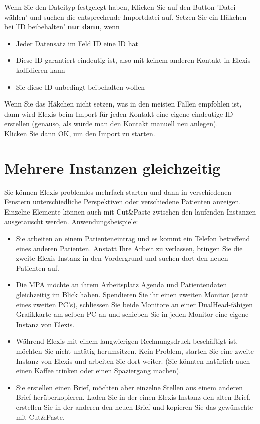 Wenn Sie den Dateityp festgelegt haben, Klicken Sie auf den Button 'Datei wählen' und suchen die entsprechende Importdatei auf. Setzen Sie ein Häkchen bei 'ID beibehalten' \textbf{nur dann}, wenn \begin{itemize}
\item Jeder Datensatz im Feld ID eine ID hat
\item Diese ID garantiert eindeutig ist, also mit keinem anderen Kontakt in Elexis kollidieren kann
\item Sie diese ID unbedingt beibehalten wollen
\end{itemize}
Wenn Sie das Häkchen nicht setzen, was in den meisten Fällen empfohlen ist, dann wird Elexis beim Import für jeden Kontakt eine eigene eindeutige ID erstellen (genauso, als würde man den Kontakt manuell neu anlegen).\\
Klicken Sie dann OK, um den Import zu starten.

 \section{Mehrere Instanzen gleichzeitig}
 Sie können Elexis problemlos mehrfach starten und dann in verschiedenen
 Fenstern unterschiedliche Perspektiven oder verschiedene Patienten anzeigen.
 Einzelne Elemente können auch mit Cut\&Paste zwischen den laufenden Instanzen
 ausgetauscht werden.
 Anwendungsbeispiele:
 \begin{itemize}
   \item Sie arbeiten an einem Patienteneintrag und es kommt ein Telefon
   betreffend eines anderen Patienten. Anstatt Ihre Arbeit zu verlassen, bringen
   Sie die zweite Elexis-Instanz in den Vordergrund und suchen dort den neuen
   Patienten auf.
   \item Die MPA möchte an ihrem Arbeitsplatz Agenda und Patientendaten
   gleichzeitig im Blick haben. Spendieren Sie ihr einen zweiten Monitor (statt
   eines zweiten PC's), schliessen Sie beide Monitore an einer DualHead-fähigen
   Grafikkarte am selben PC an und schieben Sie in jeden Monitor eine eigene
   Instanz von Elexis.
   \item Während Elexis mit einem langwierigen Rechnungsdruck beschäftigt ist,
   möch\-ten Sie nicht untätig herumsitzen. Kein Problem, starten Sie eine zweite
   Instanz von Elexis und arbeiten Sie dort weiter. (Sie könnten natürlich auch
   einen Kaffee trinken oder einen Spaziergang machen).
   \item Sie erstellen einen Brief, möchten aber einzelne Stellen aus einem
   anderen Brief herüberkopieren. Laden Sie in der einen Elexis-Instanz den
   alten Brief, erstellen Sie in der anderen den neuen Brief und kopieren Sie
   das gewünschte mit Cut\&Paste.
 \end{itemize}


